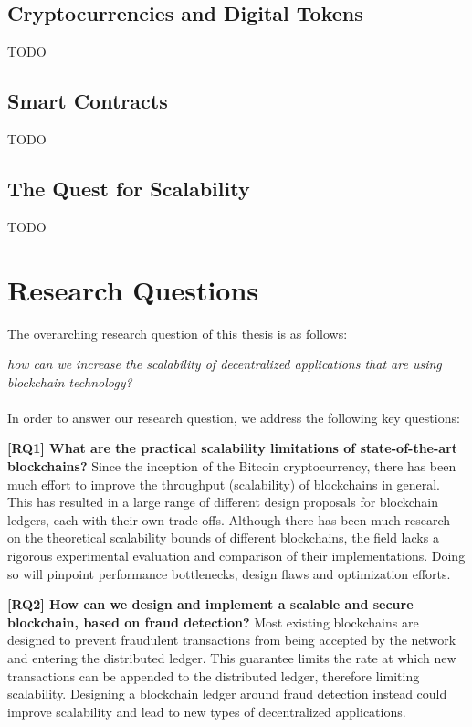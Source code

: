\subsection{Cryptocurrencies and Digital Tokens}
TODO

\subsection{Smart Contracts}
TODO

\subsection{The Quest for Scalability}
TODO


\section{Research Questions}

The overarching research question of this thesis is as follows:

\emph{how can we increase the scalability of decentralized applications that are using blockchain technology?}\\\\
In order to answer our research question, we address the following key questions:

\textbf{[RQ1] What are the practical scalability limitations of state-of-the-art blockchains?}
Since the inception of the Bitcoin cryptocurrency, there has been much effort to improve the throughput (scalability) of blockchains in general.
This has resulted in a large range of different design proposals for blockchain ledgers, each with their own trade-offs.
Although there has been much research on the theoretical scalability bounds of different blockchains, the field lacks a rigorous experimental evaluation and comparison of their implementations.
Doing so will pinpoint performance bottlenecks, design flaws and optimization efforts.

\textbf{[RQ2] How can we design and implement a scalable and secure blockchain, based on fraud detection?}
Most existing blockchains are designed to prevent fraudulent transactions from being accepted by the network and entering the distributed ledger.
This guarantee limits the rate at which new transactions can be appended to the distributed ledger, therefore limiting scalability.
Designing a blockchain ledger around fraud detection instead could improve scalability and lead to new types of decentralized applications.

